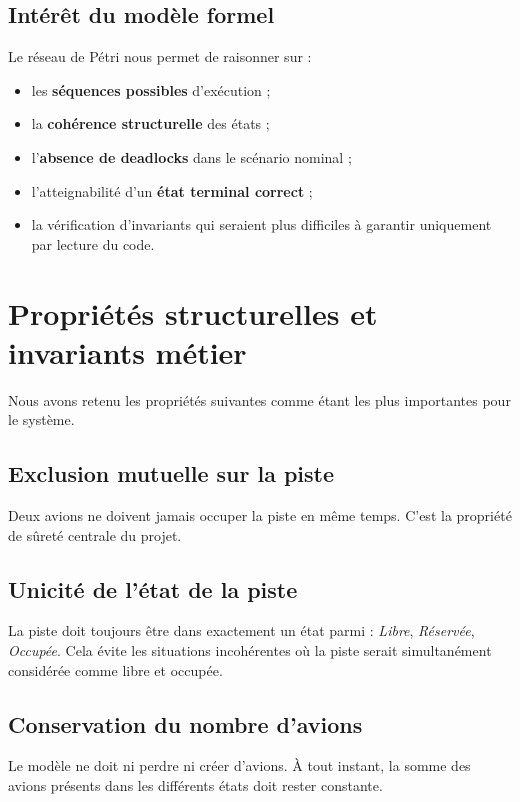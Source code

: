 \documentclass[11pt,a4paper]{article}
\begin{document}
\subsection{Intérêt du modèle formel}

Le réseau de Pétri nous permet de raisonner sur :
\begin{itemize}
    \item les \textbf{séquences possibles} d'exécution ;
    \item la \textbf{cohérence structurelle} des états ;
    \item l'\textbf{absence de deadlocks} dans le scénario nominal ;
    \item l'atteignabilité d'un \textbf{état terminal correct} ;
    \item la vérification d'invariants qui seraient plus difficiles à garantir uniquement par lecture du code.
\end{itemize}

\section{Propriétés structurelles et invariants métier}

Nous avons retenu les propriétés suivantes comme étant les plus importantes pour le système.

\subsection{Exclusion mutuelle sur la piste}

Deux avions ne doivent jamais occuper la piste en même temps. C'est la propriété de sûreté centrale du projet.

\subsection{Unicité de l'état de la piste}

La piste doit toujours être dans exactement un état parmi : \emph{Libre}, \emph{Réservée}, \emph{Occupée}. Cela évite les situations incohérentes où la piste serait simultanément considérée comme libre et occupée.

\subsection{Conservation du nombre d'avions}

Le modèle ne doit ni perdre ni créer d'avions. À tout instant, la somme des avions présents dans les différents états doit rester constante.
\end{document}
